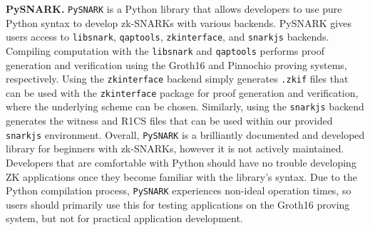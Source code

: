 
\textbf{PySNARK.}
\texttt{PySNARK} \cite{PySNARK} is a Python library that allows developers to use pure Python syntax to develop zk-SNARKs with various backends. PySNARK gives users access to \texttt{libsnark}, \texttt{qaptools}, \texttt{zkinterface}, and \texttt{snarkjs} backends. Compiling computation with the \texttt{libsnark} and \texttt{qaptools} performs proof generation and verification using the Groth16 and Pinnochio proving systems, respectively. Using the \texttt{zkinterface} backend simply generates \texttt{.zkif} files that can be used with the \texttt{zkinterface} package for proof generation and verification, where the underlying scheme can be chosen. Similarly, using the \texttt{snarkjs} backend generates the witness and R1CS files that can be used within our provided \texttt{snarkjs} environment. Overall, \texttt{PySNARK} is a brilliantly documented and developed library for beginners with zk-SNARKs, however it is not actively maintained. Developers that are comfortable with Python should have no trouble developing ZK applications once they become familiar with the library's syntax. Due to the Python compilation process, \texttt{PySNARK} experiences non-ideal operation times, so users should primarily use this for testing applications on the Groth16 proving system, but not for practical application development.


